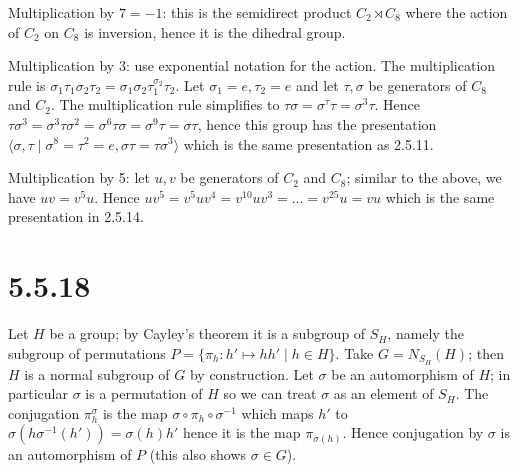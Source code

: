 \documentclass{article}
\def\<{\langle}
\def\>{\rangle}
\def\inv{{-1}}
\begin{document}
Multiplication by $7 = -1$: this is the semidirect product $C_2 \rtimes C_8$ where the action of $C_2$ on $C_8$ is inversion, hence it is the dihedral group.

Multiplication by $3$: use exponential notation for the action. The multiplication rule is $\sigma_1 \tau_1 \sigma_2 \tau_2 = \sigma_1 \sigma_2 \tau_1^{\sigma_2} \tau_2$. Let $\sigma_1 = e, \tau_2 = e$ and let $\tau, \sigma$ be generators of $C_8$ and $C_2$. The multiplication rule simplifies to $\tau \sigma = \sigma^\tau \tau = \sigma^3 \tau$. Hence $\tau \sigma^3 = \sigma^3 \tau \sigma^2 = \sigma^6 \tau \sigma = \sigma^9 \tau = \sigma \tau$, hence this group has the presentation $\< \sigma, \tau \mid \sigma^8 = \tau^2 = e, \sigma \tau = \tau \sigma^3 \>$ which is the same presentation as 2.5.11.

Multiplication by 5: let $u, v$ be generators of $C_2$ and $C_8$; similar to the above, we have $u v = v^5 u$. Hence $u v^5 = v^5 u v^4 = v^{10} u v^3 = \ldots = v^{25} u = vu$ which is the same presentation in 2.5.14.

\section*{5.5.18}

Let $H$ be a group; by Cayley's theorem it is a subgroup of $S_H$, namely the subgroup of permutations $P = \{ \pi_h: h' \mapsto hh' \mid h \in H\}$. Take $G = N_{S_H}(H)$; then $H$ is a normal subgroup of $G$ by construction. Let $\sigma$ be an automorphism of $H$; in particular $\sigma$ is a permutation of $H$ so we can treat $\sigma$ as an element of $S_H$. The conjugation $\pi_h^\sigma$ is the map $\sigma \circ \pi_h \circ \sigma^\inv$ which maps $h'$ to $\sigma(h\sigma^\inv(h')) = \sigma(h) h'$ hence it is the map $\pi_{\sigma(h)}$. Hence conjugation by $\sigma$ is an automorphism of $P$ (this also shows $\sigma \in G$).
\end{document}
